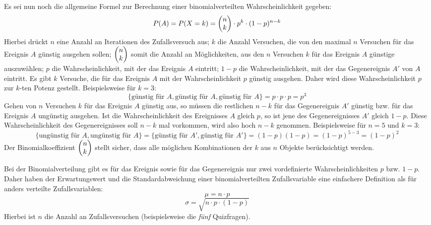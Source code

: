 Es sei nun noch die allgemeine Formel zur Berechnung einer binomialverteilten Wahrscheinlichkeit gegeben: $$P(A) = P(X=k) = \begin{pmatrix}n \\ k\end{pmatrix} \cdot p^k \cdot (1-p)^{n-k}$$ Hierbei dr\"{u}ckt $n$ eine Anzahl an Iterationen des Zufallsversuch aus; $k$ die Anzahl Versuchen, die von den maximal $n$ Versuchen f\"{u}r das Ereignis $A$ g\"{u}nstig ausgehen sollen; $\begin{pmatrix}n \\ k\end{pmatrix}$ somit die Anzahl an M\"{o}glichkeiten, aus den $n$ Versuchen $k$ f\"{u}r das Ereignis $A$ g\"{u}nstige auszuw\"{a}hlen; $p$ die Wahrscheinlichkeit, mit der das Ereignis $A$ eintritt; $1-p$ die Wahrscheinlichkeit, mit der das Gegenereignis $A'$ von $A$ eintritt. Es gibt $k$ Versuche, die f\"{u}r das Ereignis $A$ mit der Wahrscheinlichkeit $p$ g\"{u}nstig ausgehen. Daher wird diese Wahrscheinlichkeit $p$ zur $k$-ten Potenz gestellt. Beispielsweise f\"{u}r $k=3$: $$\{\text{g\"{u}nstig f\"{u}r } A, \text{g\"{u}nstig f\"{u}r } A, \text{g\"{u}nstig f\"{u}r } A\} = p \cdot p \cdot p = p^3$$ Gehen von $n$ Versuchen $k$ f\"{u}r das Ereignis $A$ g\"{u}nstig aus, so m\"{u}ssen die restlichen $n-k$ f\"{u}r das Gegenereignis $A'$ g\"{u}nstig bzw. f\"{u}r das Ereignis $A$ ung\"{u}nstig ausgehen. Ist die Wahrscheinlichkeit des Ereignisses $A$ gleich $p$, so ist jene des Gegenereignisses $A'$ gleich $1 - p$. Diese Wahrscheinlichkeit des Gegenereignisses soll $n-k$ mal vorkommen, wird also hoch $n-k$ genommen. Beispielsweise f\"{u}r $n=5$ und $k=3$: $$\{\text{ung\"{u}nstig f\"{u}r } A, \text{ung\"{u}nstig f\"{u}r } A\} = \{\text{g\"{u}nstig f\"{u}r } A', \text{g\"{u}nstig f\"{u}r } A'\} = (1-p) (1-p) = (1-p)^{5-3} = (1-p)^2$$ Der Binomialkoeffizient $\begin{pmatrix}n \\ k\end{pmatrix}$ stellt sicher, dass alle m\"{o}glichen Kombinationen der $k$ aus $n$ Objekte ber\"{u}cksichtigt werden.

Bei der Binomialverteilung gibt es f\"{u}r das Ereignis sowie f\"{u}r das Gegenereignis nur zwei vordefinierte Wahrscheinlichkeiten $p$ bzw. $1 - p$. Daher haben der Erwartungswert und die Standardabweichung einer binomialverteilten Zufallsvariable eine einfachere Definition als f\"{u}r anders verteilte Zufallsvariablen: $$\mu = n \cdot p$$ $$\sigma = \sqrt{n \cdot p \cdot (1-p)}$$ Hierbei ist $n$ die Anzahl an Zufallsversuchen (beispielsweise die \emph{f\"{u}nf} Quizfragen).

